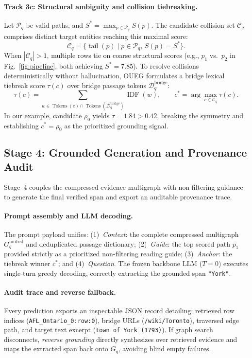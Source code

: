 \paragraph{Track 3c: Structural ambiguity and collision tiebreaking.}
\label{sec:method-ambiguity}
Let $\mathcal{P}_q$ be valid paths, and $S^* = \max_{p \in \mathcal{P}_q} S(p)$. The candidate collision set $\mathcal{C}_q$ comprises distinct target entities reaching this maximal score:
\begin{equation}
\label{eq:collision-set}
\mathcal{C}_q = \{ \operatorname{tail}(p) \mid p \in \mathcal{P}_q, \, S(p) = S^* \}.
\end{equation}
When $|\mathcal{C}_q| > 1$, multiple rows tie on coarse structural scores (e.g., $p_1$ vs.\ $p_2$ in Fig.~\ref{fig:pipeline}, both achieving $S^*=7.85$). To resolve collisions deterministically without hallucination, OUEG formulates a bridge lexical tiebreak score $\tau(c)$ over bridge passage tokens $\mathcal{D}_q^{\text{bridge}}$:
\begin{equation}
\label{eq:tiebreak-score}
\tau(c) = \sum_{w \in \operatorname{Tokens}(c) \cap \operatorname{Tokens}(\mathcal{D}_q^{\text{bridge}})} \operatorname{IDF}(w), \qquad
c^* = \arg\max_{c \in \mathcal{C}_q} \tau(c).
\end{equation}
In our example, candidate $\rho_0$ yields $\tau=1.84 > 0.42$, breaking the symmetry and establishing $c^* = \rho_0$ as the prioritized grounding signal.

\subsection{Stage 4: Grounded Generation and Provenance Audit}
\label{sec:method-answer}
Stage~4 couples the compressed evidence multigraph with non-filtering guidance to generate the final verified span and export an auditable provenance trace.

\paragraph{Prompt assembly and LLM decoding.}
The prompt payload unifies: (1)~\emph{Context}: the complete compressed multigraph $G_q^{\text{unified}}$ and deduplicated passage dictionary; (2)~\emph{Guide}: the top scored path $p_1$ provided strictly as a prioritized non-filtering reading guide; (3)~\emph{Anchor}: the tiebreak winner $c^*$; and (4)~\emph{Question}. The frozen backbone LLM ($T=0$) executes single-turn greedy decoding, correctly extracting the grounded span \texttt{"York"}.

\paragraph{Audit trace and reverse fallback.}
Every prediction exports an inspectable JSON record detailing: retrieved row indices (\texttt{AFL\_Ontario\_0:row:0}), bridge URLs (\texttt{/wiki/Toronto}), traversed edge path, and target text excerpt (\texttt{town of York (1793)}). If graph search disconnects, \emph{reverse grounding} directly synthesizes over retrieved evidence and maps the extracted span back onto $G_q$, avoiding blind empty failures.
